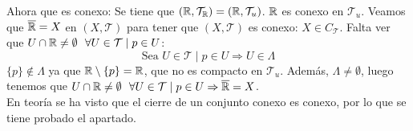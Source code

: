 \documentclass[12pt]{article}
\begin{document}
\begin{ejercicio}[3 puntos]
\begin{enumerate}[label=(\alph*)]
                \noindent
                Ahora que es conexo:\newline
                Se tiene que $(\mathbb{R}, \mathcal{T}_{\mathbb{R}}) = (\mathbb{R}, \mathcal{T}_u)$. $\mathbb{R}$ es conexo en $\mathcal{T}_u$.\newline
                Veamos que $\overline{\mathbb{R}} = X$ en $(X, \mathcal{T})$ para tener que $(X, \mathcal{T})$ es conexo:\newline
                $X \in C_{\mathcal{T}}$. Falta ver que $U \cap \mathbb{R} \neq \emptyset~~\forall U \in \mathcal{T} \mid p\in U$:
                $$\mbox{Sea } U \in \mathcal{T} \mid p \in U \Rightarrow U \in \Lambda$$
                $\{p\} \notin \Lambda$ ya que $\mathbb{R}\setminus \{p\} = \mathbb{R}$, que no es compacto en $\mathcal{T}_u$.\newline
                Además, $\Lambda \neq \emptyset$, luego tenemos que $U \cap \mathbb{R} \neq \emptyset~~\forall U \in \mathcal{T} \mid p \in U \Rightarrow \overline{\mathbb{R}} = X$.\\

                \noindent
                En teoría se ha visto que el cierre de un conjunto conexo es conexo, por lo que se tiene probado el apartado.

        \end{enumerate}
    \end{ejercicio}
\end{document}
